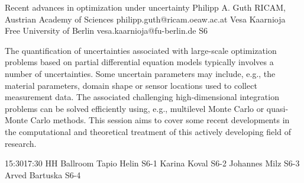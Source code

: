 \documentclass[12pt,lettersize,oneside]{book} %
\begin{document}
\clearpage

\begin{session}
 {Recent advances in optimization under uncertainty}%
 {Philipp A. Guth}%
 {RICAM, Austrian Academy of Sciences}%
 {philipp.guth@ricam.oeaw.ac.at}%
 {Vesa Kaarnioja}%
 {Free University of Berlin}%
 {vesa.kaarnioja@fu-berlin.de}%
 {S6}%
{}

 The quantification of uncertainties associated with large-scale optimization problems based on partial differential equation models typically involves a number of uncertainties. Some uncertain parameters may include, e.g., the material parameters, domain shape or sensor locations used to collect measurement data. The associated challenging high-dimensional integration problems can be solved efficiently using, e.g., multilevel Monte Carlo or quasi-Monte Carlo methods. This session aims to cover some recent developments in the computational and theoretical treatment of this actively developing field of research.
\end{session}



\sessionPart{}%
{\hfill{}
{15:30}{17:30} %
{HH Ballroom}} %
{Tapio Helin}
{S6-1}
{Karina Koval}
{S6-2}
{Johannes Milz}
{S6-3}
{Arved Bartuska}
{S6-4}



\clearpage
\end{document}
